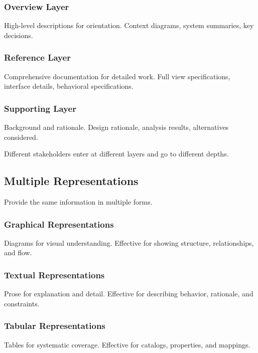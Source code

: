 \documentclass[11pt]{article}
\begin{document}
\subsubsection{Overview Layer}

High-level descriptions for orientation. Context diagrams, system summaries, key decisions.

\subsubsection{Reference Layer}

Comprehensive documentation for detailed work. Full view specifications, interface details, behavioral specifications.

\subsubsection{Supporting Layer}

Background and rationale. Design rationale, analysis results, alternatives considered.

Different stakeholders enter at different layers and go to different depths.

\subsection{Multiple Representations}

Provide the same information in multiple forms.

\subsubsection{Graphical Representations}

Diagrams for visual understanding. Effective for showing structure, relationships, and flow.

\subsubsection{Textual Representations}

Prose for explanation and detail. Effective for describing behavior, rationale, and constraints.

\subsubsection{Tabular Representations}

Tables for systematic coverage. Effective for catalogs, properties, and mappings.
\end{document}
